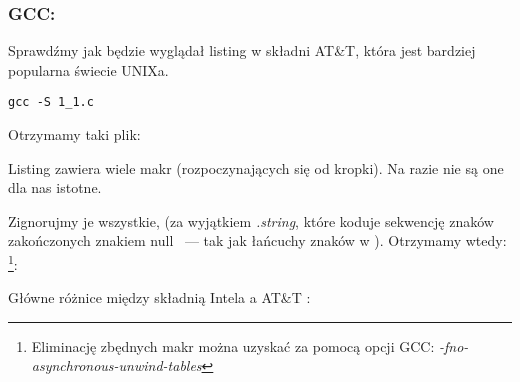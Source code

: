 \subsubsection{GCC: \ATTSyntax}
\label{ATT_syntax}

Sprawdźmy jak będzie wyglądał listing w składni AT\&T, która jest bardziej popularna świecie UNIXa.

\begin{lstlisting}[caption=kompilujemy w GCC 4.7.3]
gcc -S 1_1.c
\end{lstlisting}

Otrzymamy taki plik:



Listing zawiera wiele makr (rozpoczynających się od kropki). Na razie nie są one dla nas istotne.

Zignorujmy je wszystkie, (za wyjątkiem \emph{.string}, które koduje sekwencję znaków zakończonych znakiem null ~--- tak jak łańcuchy znaków w \Cpp). Otrzymamy wtedy:
\footnote{Eliminację zbędnych makr można uzyskać za pomocą opcji GCC: \emph{-fno-asynchronous-unwind-tables}}:



\myindex{\ATTSyntax}
\myindex{\IntelSyntax}
Główne różnice między składnią Intela a AT\&T :

